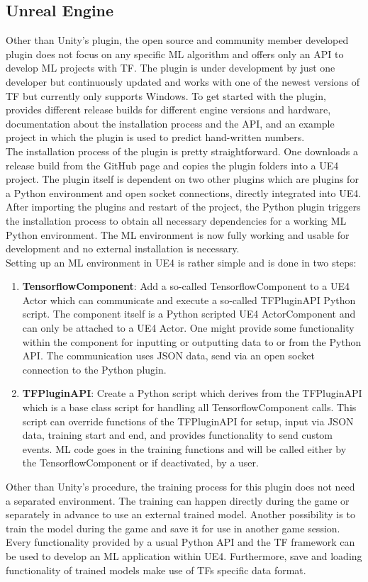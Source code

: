 \documentclass[MGS,Master,english]{twbook}%
\begin{document}
\subsection{Unreal Engine}
Other than Unity’s plugin, the open source and community member developed plugin does not focus on any specific ML algorithm and offers only an API to develop ML projects with \ac{TF}. The plugin is under development by just one developer but continuously updated and works with one of the newest versions of \ac{TF} but currently only supports Windows. To get started with the plugin, \citep{ue4::tensorFlowPlugin} provides different release builds for different engine versions and hardware, documentation about the installation process and the API, and an example project in which the plugin is used to predict hand-written numbers.\\
The installation process of the plugin is pretty straightforward. One downloads a release build from the GitHub page and copies the plugin folders into a \ac{UE4} project. The plugin itself is dependent on two other plugins which are plugins for a Python environment and open socket connections, directly integrated into UE4. After importing the plugins and restart of the project, the Python plugin triggers the installation process to obtain all necessary dependencies for a working ML Python environment. The ML environment is now fully working and usable for development and no external installation is necessary.\\
Setting up an ML environment in UE4 is rather simple and is done in two steps:
\begin{enumerate}
	\item \textbf{TensorflowComponent}: Add a so-called TensorflowComponent to a UE4 Actor which can communicate and execute a so-called TFPluginAPI Python script. The component itself is a Python scripted UE4 ActorComponent and can only be attached to a UE4 Actor. One might provide some functionality within the component for inputting or outputting data to or from the Python API. The communication uses JSON data, send via an open socket connection to the Python plugin.
	\item \textbf{TFPluginAPI}: Create a Python script which derives from the TFPluginAPI which is a base class script for handling all TensorflowComponent calls. This script can override functions of the TFPluginAPI for setup, input via JSON data, training start and end, and provides functionality to send custom events. ML code goes in the training functions and will be called either by the TensorflowComponent or if deactivated, by a user.
\end{enumerate}
Other than Unity’s procedure, the training process for this plugin does not need a separated environment. The training can happen directly during the game or separately in advance to use an external trained model. Another possibility is to train the model during the game and save it for use in another game session. Every functionality provided by a usual Python API and the \ac{TF} framework can be used to develop an ML application within UE4. Furthermore, save and loading functionality of trained models make use of \acp{TF} specific data format.
\end{document}
